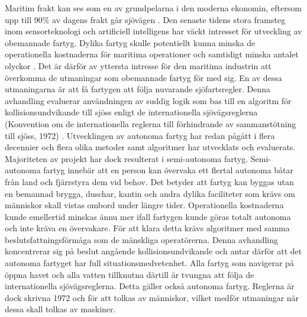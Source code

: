 \renewcommand{\thesection}{\arabic{section}}
\label{app:swed_sum} %

Maritim frakt kan ses som en av grundpelarna i den moderna ekonomin, eftersom upp till 90\% av dagens frakt går sjövägen \cite{percent_trade}. Den senaste tidens stora framsteg inom sensorteknologi och artificiell intelligens har väckt intresset för utveckling av obemannade fartyg. Dylika fartyg skulle  potentiellt kunna minska de operationella kostnaderna för maritima operationer och samtidigt minska antalet olyckor \cite{manley2008unmanned,marine_casualities_incidents_2017}. Det är därför av yttersta intresse för den maritima industrin att överkomma de utmaningar som obemannade fartyg för med sig. En av dessa utmaningarna är att få fartygen att följa nuvarande sjöfartsregler. Denna avhandling  evaluerar användningen av suddig logik som bas till en algoritm för kollisionsundvikande till sjöss enligt  de internationella sjövägsreglerna (Konvention om de internationella reglerna till förhindrande av sammanstötning till sjöss, 1972) \cite{colreg}.
Utvecklingen av autonoma fartyg har redan pågått i flera decennier och flera olika metoder samt algoritmer har utvecklats och evaluerats. Majoriteten av projekt har dock resulterat i semi-autonoma fartyg. Semi-autonoma fartyg innebär att en person kan övervaka ett flertal autonoma båtar från land och fjärrstyra dem vid behov. Det betyder att fartyg kan byggas utan en bemannad brygga, duschar, kantin och andra dylika faciliteter som krävs om människor skall vistas ombord under längre tider. Operationella kostnaderna kunde emellertid minskas ännu mer ifall fartygen kunde göras totalt autonoma och inte kräva en övervakare. För att klara detta krävs algoritmer med samma beslutsfattningsförmåga som de mänskliga operatörerna. Denna avhandling koncentrerar sig på beslut angående kollisionsundvikande och antar därför att det autonoma fartyget har full situationsmedvetenhet.
Alla fartyg som navigerar på öppna havet och alla vatten tillknutna därtill är tvungna att följa de internationella sjövägsreglerna. Detta gäller också autonoma fartyg. Reglerna är dock skrivna 1972 och för att tolkas av människor, vilket medför utmaningar när dessa skall tolkas av maskiner.


